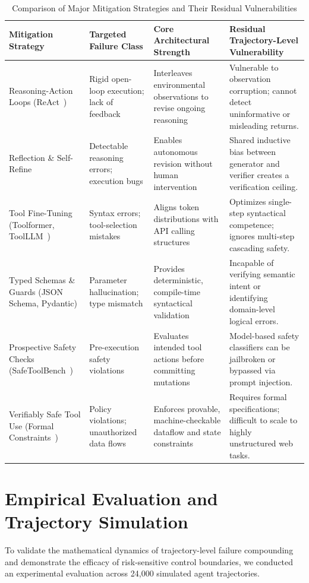 \documentclass[conference]{IEEEtran}
\begin{document}
\begin{table}[t]
\caption{Comparison of Major Mitigation Strategies and Their Residual Vulnerabilities}
\label{tab:mitigations}
\centering
\footnotesize
\renewcommand{\arraystretch}{1.2}
\begin{tabular}{p{3.2cm}p{3.4cm}p{4.6cm}p{4.6cm}}
\toprule
\textbf{Mitigation Strategy} & \textbf{Targeted Failure Class} & \textbf{Core Architectural Strength} & \textbf{Residual Trajectory-Level Vulnerability} \\
\midrule
Reasoning-Action Loops (ReAct~\cite{yao2023react}) & Rigid open-loop execution; lack of feedback & Interleaves environmental observations to revise ongoing reasoning & Vulnerable to observation corruption; cannot detect uninformative or misleading returns. \\
Reflection \& Self-Refine~\cite{madaan2023selfrefine, shinn2023reflexion} & Detectable reasoning errors; execution bugs & Enables autonomous revision without human intervention & Shared inductive bias between generator and verifier creates a verification ceiling. \\
Tool Fine-Tuning (Toolformer, ToolLLM~\cite{schick2023toolformer, qin2024toolllm}) & Syntax errors; tool-selection mistakes & Aligns token distributions with API calling structures & Optimizes single-step syntactical competence; ignores multi-step cascading safety. \\
Typed Schemas \& Guards (JSON Schema, Pydantic) & Parameter hallucination; type mismatch & Provides deterministic, compile-time syntactical validation & Incapable of verifying semantic intent or identifying domain-level logical errors. \\
Prospective Safety Checks (SafeToolBench~\cite{xia2025safetoolbench}) & Pre-execution safety violations & Evaluates intended tool actions before committing mutations & Model-based safety classifiers can be jailbroken or bypassed via prompt injection. \\
Verifiably Safe Tool Use (Formal Constraints~\cite{doshi2026towards}) & Policy violations; unauthorized data flows & Enforces provable, machine-checkable dataflow and state constraints & Requires formal specifications; difficult to scale to highly unstructured web tasks. \\
\bottomrule
\end{tabular}
\end{table}

\section{Empirical Evaluation and Trajectory Simulation}
To validate the mathematical dynamics of trajectory-level failure compounding and demonstrate the efficacy of risk-sensitive control boundaries, we conducted an experimental evaluation across 24,000 simulated agent trajectories.
\end{document}
